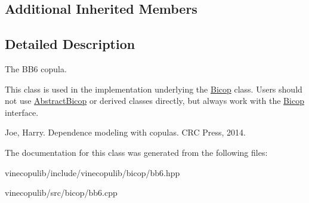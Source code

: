 \subsection*{Additional Inherited Members}


\subsection{Detailed Description}
The B\+B6 copula. 

This class is used in the implementation underlying the \hyperlink{classvinecopulib_1_1_bicop}{Bicop} class. Users should not use \hyperlink{classvinecopulib_1_1_abstract_bicop}{Abstract\+Bicop} or derived classes directly, but always work with the \hyperlink{classvinecopulib_1_1_bicop}{Bicop} interface.

Joe, Harry. Dependence modeling with copulas. C\+R\+C Press, 2014. 

The documentation for this class was generated from the following files\+:\begin{DoxyCompactItemize}
\item 
vinecopulib/include/vinecopulib/bicop/bb6.\+hpp\item 
vinecopulib/src/bicop/bb6.\+cpp\end{DoxyCompactItemize}
